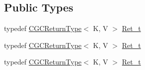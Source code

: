 \subsection*{Public Types}
\begin{DoxyCompactItemize}
\item 
typedef \mbox{\hyperlink{structHadron_1_1CGCReturnType}{C\+G\+C\+Return\+Type}}$<$ K, V $>$ \mbox{\hyperlink{classHadron_1_1CGCIntTarget_a3436ab6591c4722808ea25ced7b18c46}{Ret\+\_\+t}}
\item 
typedef \mbox{\hyperlink{structHadron_1_1CGCReturnType}{C\+G\+C\+Return\+Type}}$<$ K, V $>$ \mbox{\hyperlink{classHadron_1_1CGCIntTarget_a3436ab6591c4722808ea25ced7b18c46}{Ret\+\_\+t}}
\item 
typedef \mbox{\hyperlink{structHadron_1_1CGCReturnType}{C\+G\+C\+Return\+Type}}$<$ K, V $>$ \mbox{\hyperlink{classHadron_1_1CGCIntTarget_a3436ab6591c4722808ea25ced7b18c46}{Ret\+\_\+t}}
\end{DoxyCompactItemize}
